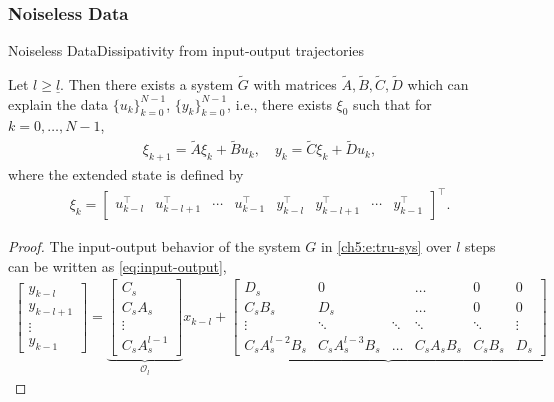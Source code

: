 \documentclass[aspectratio=169, handout, 10pt, hyperref=colorlinks]{beamer}
\begin{document}
\subsubsection{Noiseless Data}
\begin{frame}[allowframebreaks]{Noiseless Data}{Dissipativity from input-output trajectories}
    \begin{lem}
    \label{lem:extended}
    Let $l \geq \underline{l}$. Then there exists a system $\widetilde{G}$ with matrices $\widetilde{A},\widetilde{B},\widetilde{C},\widetilde{D}$ which can explain the data $\{u_k\}_{k=0}^{N-1}$, $\{y_k\}_{k=0}^{N-1}$, i.e., there exists $\xi_0$ such that for $k=0,\dots,N-1$,
    \begin{align}\label{eq:sys_stacked}
    \xi_{k+1} = \widetilde{A} \xi_k + \widetilde{B} u_k, \quad
    y_k = \widetilde{C} \xi_k + \widetilde{D} u_k,
    \end{align}
    where the extended state is defined by
    \begin{align*}
    {
    \xi_{k} = \begin{bmatrix} u_{k-l}^\top & u_{k-l+1}^\top & \cdots & u_{k-1}^\top & y_{k-l}^\top & y_{k-l+1}^\top & \cdots & y_{k-1}^\top \end{bmatrix}^\top.}
    \end{align*} 
    \end{lem}
    \begin{proof}
    The input-output behavior of the system $G$ in \eqref{ch5:e:tru-sys} over $l$ steps can be written as \eqref{eq:input-output},
    \begin{align}
    \begin{bmatrix} y_{k-l} \\ y_{k-l+1} \\ \vdots \\ y_{k-1} \end{bmatrix} = \underbrace{\begin{bmatrix} C_s \\ C_sA_s \\ \vdots \\ C_sA_s^{l-1} \end{bmatrix}}_{\mathcal{O}_l} x_{k-l} + 
    \underbrace{\begin{bmatrix} 
    D_s & 0 & & \dots & 0 & 0 \\
    C_sB_s & D _s& & \dots & 0 & 0 \\
    \vdots & \ddots & \ddots&\ddots&\ddots&\vdots \\
    C_sA_s^{l-2}B_s & C_sA_s^{l-3}B_s &\dots & C_sA_sB_s & C_sB_s &D_s

\end{bmatrix}}
\end{align}
\end{proof}
\end{frame}
\end{document}

